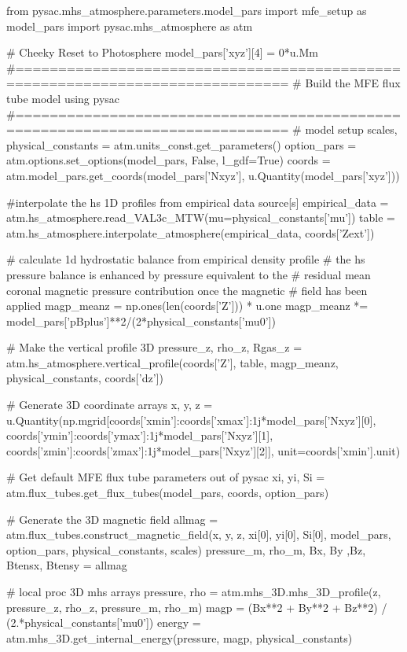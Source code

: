 \begin{pycode}[chapter3]
from pysac.mhs_atmosphere.parameters.model_pars import mfe_setup as model_pars
import pysac.mhs_atmosphere as atm

# Cheeky Reset to Photosphere
model_pars['xyz'][4] = 0*u.Mm
#==============================================================================
# Build the MFE flux tube model using pysac
#==============================================================================
# model setup
scales, physical_constants = atm.units_const.get_parameters()
option_pars = atm.options.set_options(model_pars, False, l_gdf=True)
coords = atm.model_pars.get_coords(model_pars['Nxyz'], u.Quantity(model_pars['xyz']))

#interpolate the hs 1D profiles from empirical data source[s]
empirical_data = atm.hs_atmosphere.read_VAL3c_MTW(mu=physical_constants['mu'])
table = atm.hs_atmosphere.interpolate_atmosphere(empirical_data, coords['Zext'])

# calculate 1d hydrostatic balance from empirical density profile
# the hs pressure balance is enhanced by pressure equivalent to the
# residual mean coronal magnetic pressure contribution once the magnetic
# field has been applied
magp_meanz = np.ones(len(coords['Z'])) * u.one
magp_meanz *= model_pars['pBplus']**2/(2*physical_constants['mu0'])

# Make the vertical profile 3D
pressure_z, rho_z, Rgas_z = atm.hs_atmosphere.vertical_profile(coords['Z'], table, magp_meanz, physical_constants, coords['dz'])

# Generate 3D coordinate arrays
x, y, z = u.Quantity(np.mgrid[coords['xmin']:coords['xmax']:1j*model_pars['Nxyz'][0],
                              coords['ymin']:coords['ymax']:1j*model_pars['Nxyz'][1],
                              coords['zmin']:coords['zmax']:1j*model_pars['Nxyz'][2]], unit=coords['xmin'].unit)

# Get default MFE flux tube parameters out of pysac
xi, yi, Si = atm.flux_tubes.get_flux_tubes(model_pars, coords, option_pars)

# Generate the 3D magnetic field
allmag = atm.flux_tubes.construct_magnetic_field(x, y, z, xi[0], yi[0], Si[0], model_pars, option_pars, physical_constants, scales)
pressure_m, rho_m, Bx, By ,Bz, Btensx, Btensy = allmag

# local proc 3D mhs arrays
pressure, rho = atm.mhs_3D.mhs_3D_profile(z, pressure_z, rho_z, pressure_m, rho_m)
magp = (Bx**2 + By**2 + Bz**2) / (2.*physical_constants['mu0'])
energy = atm.mhs_3D.get_internal_energy(pressure, magp, physical_constants)
\end{pycode}

